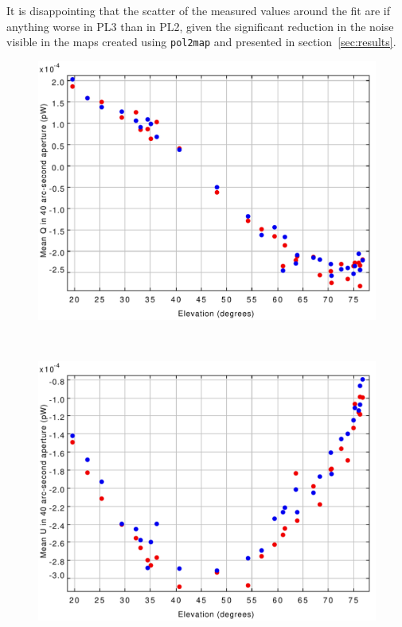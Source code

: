 \documentclass[twoside,11pt]{starlink}
\begin{document}
It is disappointing that the scatter of the measured values around the
fit are if anything worse in PL3 than in PL2, given the significant
reduction in the noise visible in the maps created using \texttt{pol2map}
and presented in section~\ref{sec:results}.

\begin{figure}
\centering
\begin{minipage}{.45\textwidth}
  \centering
  \includegraphics[width=.95\linewidth]{ip/fig1}
\end{minipage}
~~
\begin{minipage}{.45\textwidth}
  \centering
  \includegraphics[width=.95\linewidth]{ip/fig2}
\end{minipage}
\end{figure}
\end{document}
